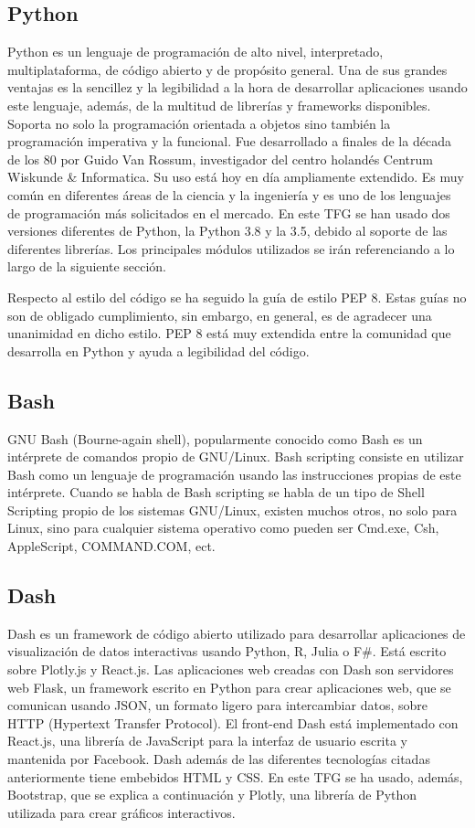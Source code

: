 \documentclass[a4paper, 12pt, oneside]{book}
\begin{document}
\subsection{Python}
\label{subsec:python}
Python es un lenguaje de programación de alto nivel, interpretado, multiplataforma, de código abierto y de propósito general. Una de sus grandes ventajas es la sencillez y la legibilidad a la hora de desarrollar aplicaciones usando este lenguaje, además, de la multitud de librerías y frameworks disponibles. Soporta no solo la programación orientada a objetos sino también la programación imperativa y la funcional.
Fue desarrollado a finales de la década de los 80 por Guido Van Rossum, investigador del centro holandés Centrum Wiskunde \& Informatica.
Su uso está hoy en día ampliamente extendido. Es muy común en diferentes áreas de la ciencia y la ingeniería y es uno de los lenguajes de programación más solicitados en el mercado.
En este TFG se han usado dos versiones diferentes de Python, la Python 3.8 y la 3.5, debido al soporte de las diferentes librerías.
Los principales módulos utilizados se irán referenciando a lo largo de la siguiente sección.

Respecto al estilo del código se ha seguido la guía de estilo PEP 8. Estas guías no son de obligado cumplimiento, sin embargo, en general, es de agradecer una unanimidad en dicho estilo. PEP 8 está muy extendida entre la comunidad que desarrolla en Python y ayuda a legibilidad del código.

\subsection{Bash}
\label{subsec:bash}
GNU Bash (Bourne-again shell), popularmente conocido como Bash es un intérprete de comandos propio de GNU/Linux.
Bash scripting consiste en utilizar Bash como un lenguaje de programación usando las instrucciones propias de este intérprete. Cuando se habla de Bash scripting se habla de un tipo de Shell Scripting propio de los sistemas GNU/Linux, existen muchos otros, no solo para Linux, sino para cualquier sistema operativo como pueden ser Cmd.exe, Csh, AppleScript, COMMAND.COM, ect.

\subsection{Dash}
\label{subsec:dash}

Dash es un framework de código abierto utilizado para desarrollar aplicaciones de visualización de datos interactivas usando Python, R, Julia o F\#. Está escrito sobre Plotly.js y React.js. Las aplicaciones web creadas con Dash son servidores web Flask, un framework escrito en Python para crear aplicaciones web, que se comunican usando JSON, un formato ligero para intercambiar datos, sobre HTTP (Hypertext Transfer Protocol).
El front-end Dash está implementado con React.js, una librería de JavaScript para la interfaz de usuario escrita y mantenida por Facebook. Dash además de las diferentes tecnologías citadas anteriormente tiene embebidos HTML y CSS. En este TFG se ha usado, además, Bootstrap, que se explica a continuación y Plotly, una librería de Python utilizada para crear gráficos interactivos.
\end{document}
